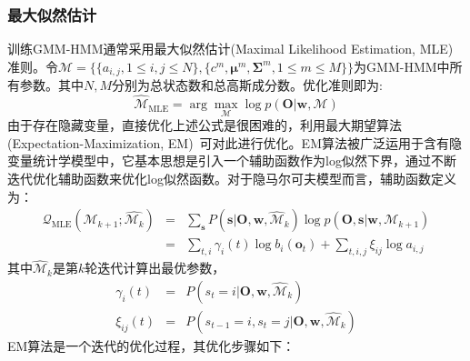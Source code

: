 \subsubsection{最大似然估计}
训练GMM-HMM通常采用最大似然估计(Maximal Likelihood Estimation, MLE)准则。令$\mathcal{M}= \lbrace \{ a_{i,j}, 1 \le i,j \le N \}, \{ c^m, \bm{\mu}^m, \bm{\Sigma}^m, 1 \le m \le M \} \rbrace$为GMM-HMM中所有参数。其中$N,M$分别为总状态数和总高斯成分数。优化准则即为:
\begin{equation}
    \hat{\mathcal{M}}_{\text{MLE}} = \arg \max_{\mathcal{M}}\log p(\mathbf{O}|\mathbf{w}, \mathcal{M}) 
\end{equation}
由于存在隐藏变量，直接优化上述公式是很困难的，利用最大期望算法(Expectation-Maximization, EM)~\cite{dempster1977maximum}可对此进行优化。EM算法被广泛运用于含有隐变量统计学模型中，它基本思想是引入一个辅助函数作为log似然下界，通过不断迭代优化辅助函数来优化log似然函数。对于隐马尔可夫模型而言，辅助函数定义为：
\begin{eqnarray}
\mathcal{Q}_{\text{MLE}}(\mathcal{M}_{k+1};\hat{\mathcal{M}_{k}}) &=& \sum_{\mathbf{s}} P(\mathbf{s}|\mathbf{O},\mathbf{w}, \hat{\mathcal{M}}_k) \log p(\mathbf{O}, \mathbf{s}|\mathbf{w}, \mathcal{M}_{k+1}) \\
&=& \sum_{t,i} \gamma_i(t)\log b_i(\mathbf{o}_t) + \sum_{t,i,j}\xi_{ij}\log a_{i,j}
\end{eqnarray}
其中$\hat{\mathcal{M}}_k$是第$k$轮迭代计算出最优参数，
\begin{eqnarray}
\gamma_i(t)&=&P(s_t=i|\mathbf{O},\mathbf{w},\hat{\mathcal{M}}_k) \\
\xi_{ij}(t)&=&P(s_{t-1}=i,s_t=j|\mathbf{O},\mathbf{w},\hat{\mathcal{M}}_k)
\end{eqnarray}
EM算法是一个迭代的优化过程，其优化步骤如下：
